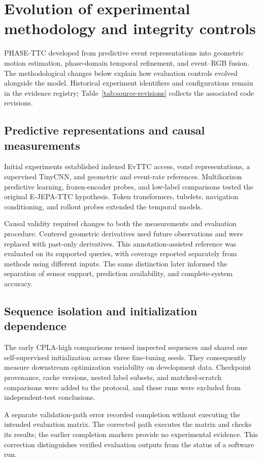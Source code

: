 \section{Evolution of experimental methodology and integrity controls}
\label{sec:history}

PHASE-TTC developed from predictive event representations into geometric motion estimation, phase-domain temporal refinement, and event--RGB fusion. The methodological changes below explain how evaluation controls evolved alongside the model. Historical experiment identifiers and configurations remain in the evidence registry; Table~\ref{tab:source-revisions} collects the associated code revisions.

\subsection{Predictive representations and causal measurements}
Initial experiments established indexed EvTTC access, voxel representations, a supervised TinyCNN, and geometric and event-rate references. Multihorizon predictive learning, frozen-encoder probes, and low-label comparisons tested the original E-JEPA-TTC hypothesis. Token transformers, tubelets, navigation conditioning, and rollout probes extended the temporal models.

Causal validity required changes to both the measurements and evaluation procedure. Centered geometric derivatives used future observations and were replaced with past-only derivatives. This annotation-assisted reference was evaluated on its supported queries, with coverage reported separately from methods using different inputs. The same distinction later informed the separation of sensor support, prediction availability, and complete-system accuracy.

\subsection{Sequence isolation and initialization dependence}
The early CPLA-high comparisons reused inspected sequences and shared one self-supervised initialization across three fine-tuning seeds. They consequently measure downstream optimization variability on development data. Checkpoint provenance, cache versions, nested label subsets, and matched-scratch comparisons were added to the protocol, and these runs were excluded from independent-test conclusions.

A separate validation-path error recorded completion without executing the intended evaluation matrix. The corrected path executes the matrix and checks its results; the earlier completion markers provide no experimental evidence. This correction distinguishes verified evaluation outputs from the status of a software run.

